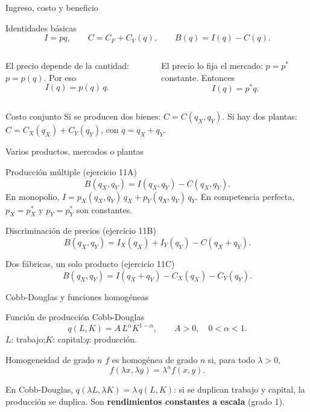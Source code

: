 \documentclass[aspectratio=169]{beamer}
\begin{document}
\begin{frame}{Ingreso, costo y beneficio}
  \begin{block}{Identidades básicas}
    \[
      I=pq,\qquad C=C_F+C_V(q),\qquad B(q)=I(q)-C(q).
    \]
  \end{block}
  \begin{columns}[T]
    \begin{mwextra}[Monopolio]
      El precio depende de la cantidad: \(p=p(q)\). Por eso
      \[
        I(q)=p(q)\,q.
      \]
    \end{mwextra}
    \begin{mwextra}
      El precio lo fija el mercado: \(p=p^{*}\) constante. Entonces
      \[
        I(q)=p^{*}q.
      \]
    \end{mwextra}
  \end{columns}
  \vspace{2pt}
  \begin{alertblock}{Costo conjunto}
    Si se producen dos bienes: \(C=C(q_X,q_Y)\). Si hay dos plantas:
    \(C=C_X(q_X)+C_Y(q_Y)\), con \(q=q_X+q_Y\).
  \end{alertblock}
\end{frame}

\begin{frame}{Varios productos, mercados o plantas}
  \begin{block}{Producción múltiple (ejercicio 11A)}
    \[
      B(q_X,q_Y)=I(q_X,q_Y)-C(q_X,q_Y).
    \]
    En monopolio, \(I=p_X(q_X,q_Y)\,q_X+p_Y(q_X,q_Y)\,q_Y\). En competencia
    perfecta, \(p_X=p_X^{*}\) y \(p_Y=p_Y^{*}\) son constantes.
  \end{block}
  \begin{block}{Discriminación de precios (ejercicio 11B)}
    \[
      B(q_X,q_Y)=I_X(q_X)+I_Y(q_Y)-C(q_X+q_Y).
    \]
  \end{block}
  \begin{block}{Dos fábricas, un solo producto (ejercicio 11C)}
    \[
      B(q_X,q_Y)=I(q_X+q_Y)-C_X(q_X)-C_Y(q_Y).
    \]
  \end{block}
\end{frame}

\begin{frame}{Cobb-Douglas y funciones homogéneas}
  \begin{block}{Función de producción Cobb-Douglas}
    \[
      q(L,K)=A\,L^{\alpha}K^{1-\alpha},\qquad A>0,\quad 0<\alpha<1.
    \]
    \(L\): trabajo;\quad \(K\): capital;\quad \(q\): producción.
  \end{block}
  \begin{block}{Homogeneidad de grado \(n\)}
    \(f\) es homogénea de grado \(n\) si, para todo \(\lambda>0\),
    \[
      f(\lambda x,\lambda y)=\lambda^{n}f(x,y).
    \]
  \end{block}
  \begin{mwextra}
    En Cobb-Douglas, \(q(\lambda L,\lambda K)=\lambda\,q(L,K)\): si se duplican
    trabajo y capital, la producción se duplica. Son \textbf{rendimientos
    constantes a escala} (grado 1).
  \end{mwextra}
\end{frame}
\end{document}
